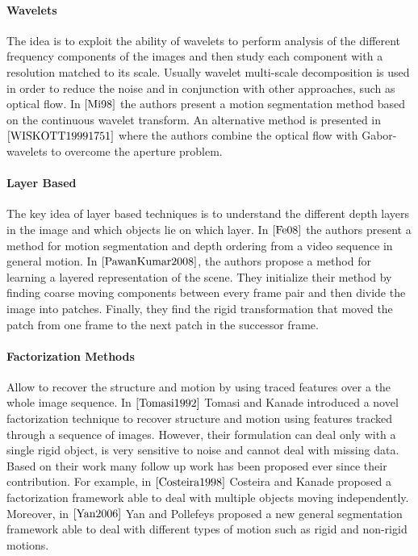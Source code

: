 \paragraph{Wavelets}
The idea is to exploit the ability of wavelets to perform analysis of the different frequency components of the images and then study each component with a resolution matched to its scale. Usually wavelet multi-scale decomposition is used in order to reduce the noise and in conjunction with other approaches, such as optical flow. In $\cite{Mi98}$ the authors present a motion segmentation method based on the continuous wavelet transform. An alternative method is presented in $\cite{WISKOTT19991751}$ where the authors combine the optical flow with Gabor-wavelets to overcome the aperture problem. 

\paragraph{Layer Based} The key idea of layer based techniques is to understand the different depth layers in the image and which objects lie on which layer. In $\cite{Fe08}$ the authors present a method for motion segmentation and depth ordering from a video sequence in general motion. In $\cite{PawanKumar2008}$, the authors propose a method for learning a layered representation of the scene. They initialize their method by finding coarse moving components between every frame pair and then divide the image into patches. Finally, they find the rigid transformation that moved the patch from one frame to the next patch in the successor frame.

\paragraph{Factorization Methods} Allow to recover the structure and motion by using traced features over a the whole image sequence. In $\cite{Tomasi1992}$ Tomasi and Kanade introduced a novel factorization technique to recover structure and motion using features tracked through a sequence of images. However, their formulation can deal only with a single rigid object, is very sensitive to noise and cannot deal with missing data. Based on their work many follow up work has been proposed ever since their contribution. For example, in $\cite{Costeira1998}$ Costeira and Kanade proposed a factorization framework able to deal with multiple objects moving independently. Moreover, in $\cite{Yan2006}$ Yan and Pollefeys proposed a new general segmentation framework able to deal with different types of motion such as rigid and non-rigid motions. 


